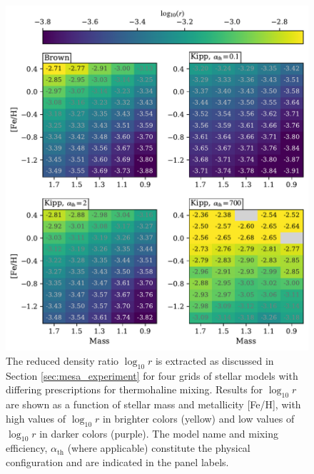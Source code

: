 \begin{figure}
    \centering
    \includegraphics[width=\textwidth]{figures/mesa_spread/mesa_r_spread.pdf}
    \caption{The reduced density ratio $\log_{10} r$ is extracted as discussed in Section \ref{sec:mesa_experiment} for four grids of stellar models with differing prescriptions for thermohaline mixing. 
    Results for $\log_{10} r$ are shown as a function of stellar mass and metallicity [Fe/H], with high values of $\log_{10} r$ in brighter colors (yellow) and low values of $\log_{10} r$ in darker colors (purple). 
    The model name and mixing efficiency, $\alpha_{\text{th}}$ (where applicable) constitute the physical configuration and are indicated in the panel labels.}
    \label{fig:mesa_r_spread}
\end{figure}